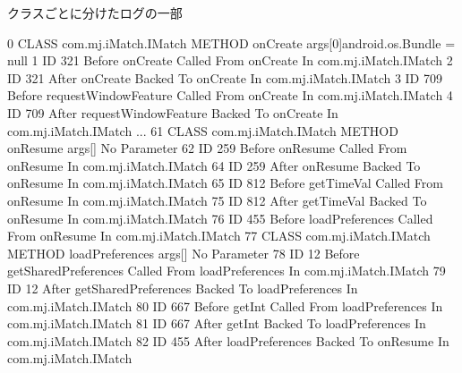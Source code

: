 \begin{itembox}[c]{クラスごとに分けたログの一部}
\footnotesize{
\begin{verbatimtab}[4]
0 CLASS com.mj.iMatch.IMatch METHOD onCreate args[0]android.os.Bundle = null
1	 ID 321 Before onCreate Called From onCreate In com.mj.iMatch.IMatch
2	 ID 321 After onCreate Backed To  onCreate In com.mj.iMatch.IMatch
3	 ID 709 Before requestWindowFeature Called From onCreate In com.mj.iMatch.IMatch
4	 ID 709 After requestWindowFeature Backed To  onCreate In com.mj.iMatch.IMatch
...
61 CLASS com.mj.iMatch.IMatch METHOD onResume args[] No Parameter
62	 ID 259 Before onResume Called From onResume In com.mj.iMatch.IMatch
64	 ID 259 After onResume Backed To  onResume In com.mj.iMatch.IMatch
65	 ID 812 Before getTimeVal Called From onResume In com.mj.iMatch.IMatch
75	 ID 812 After getTimeVal Backed To  onResume In com.mj.iMatch.IMatch
76	 ID 455 Before loadPreferences Called From onResume In com.mj.iMatch.IMatch
77	 CLASS com.mj.iMatch.IMatch METHOD loadPreferences args[] No Parameter
78		 ID 12 Before getSharedPreferences Called From loadPreferences 
In com.mj.iMatch.IMatch
79		 ID 12 After getSharedPreferences Backed To  loadPreferences 
In com.mj.iMatch.IMatch
80		 ID 667 Before getInt Called From loadPreferences In com.mj.iMatch.IMatch
81		 ID 667 After getInt Backed To  loadPreferences In com.mj.iMatch.IMatch
82	 ID 455 After loadPreferences Backed To  onResume In com.mj.iMatch.IMatch

\end{verbatimtab}
}
\end{itembox}
